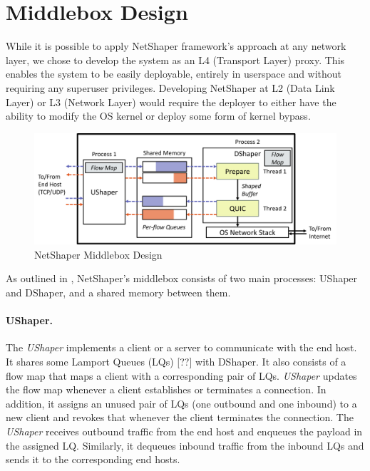 \section{Middlebox Design}
\label{sec:mb-design}

While it is possible to apply NetShaper framework's approach at any network layer, we chose to develop the system as an L4 (Transport Layer) proxy.
This enables the system to be easily deployable, entirely in userspace and without requiring any superuser privileges. 
Developing NetShaper at L2 (Data Link Layer) or L3 (Network Layer) would require the deployer to either have the ability to modify the OS kernel or deploy some form of kernel bypass.

\begin{figure}[!htb]
    \centering
    \includegraphics[width=\columnwidth]{figures/netshaper/middlebox-design.png}
    \caption{NetShaper Middlebox Design}
    \label{fig:middlebox-design}
\end{figure}

As outlined in , NetShaper's middlebox consists of two main processes: UShaper and DShaper, and a shared memory between them.

\paragraph{UShaper.}
The \textit{UShaper} implements a client or a server to communicate with the end host.
It shares some Lamport Queues (LQs) [??] with DShaper.
It also consists of a flow map that maps a client with a corresponding pair of LQs.
\textit{UShaper} updates the flow map whenever a client establishes or terminates a connection.
In addition, it assigns an unused pair of LQs (one outbound and one inbound) to a new client and revokes that whenever the client terminates the connection.
The \textit{UShaper} receives outbound traffic from the end host and enqueues the payload in the assigned LQ.
Similarly, it dequeues inbound traffic from the inbound LQs and sends it to the corresponding end hosts.


